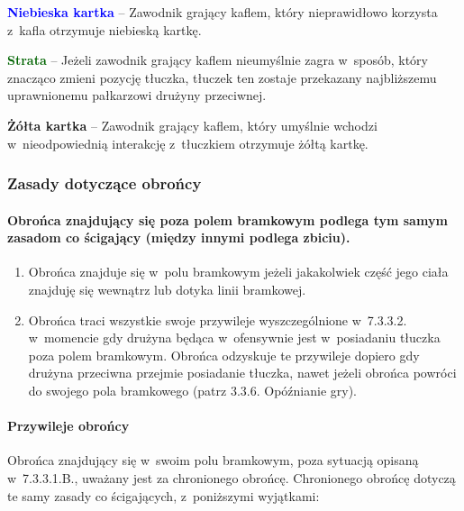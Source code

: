 \documentclass[12pt]{article}
\newcommand\yellowcard[1]{\bgroup\textcolor{darkyellow}{\textbf{#1}}}
\newcommand\bluecard[1]{\bgroup\textcolor{blue}{\textbf{#1}}}
\newcommand\other[1]{\bgroup\textcolor{darkgreen}{\textbf{#1}}}
\begin{document}
\bluecard{Niebieska kartka} -- Zawodnik grający kaflem, który nieprawidłowo
korzysta z~kafla otrzymuje niebieską kartkę.

\other{Strata} -- Jeżeli zawodnik grający kaflem nieumyślnie zagra w~sposób, który znacząco zmieni pozycję tłuczka, tłuczek ten zostaje
przekazany najbliższemu uprawnionemu pałkarzowi drużyny przeciwnej.

\yellowcard{Żółta kartka} -- Zawodnik grający kaflem, który umyślnie wchodzi w~nieodpowiednią interakcję z~tłuczkiem otrzymuje żółtą kartkę.

\subsubsection{Zasady dotyczące obrońcy}

\paragraph{Obrońca znajdujący się poza polem bramkowym podlega
	tym samym zasadom co ścigający (między innymi podlega zbiciu).}

\begin{enumerate}
	\item
	      Obrońca znajduje się w~polu bramkowym jeżeli jakakolwiek część jego
	      ciała znajduję się wewnątrz lub dotyka linii bramkowej.
	\item
	      Obrońca traci wszystkie swoje przywileje wyszczególnione w~7.3.3.2. w~momencie gdy drużyna będąca w~ofensywnie jest w~posiadaniu tłuczka
	      poza polem bramkowym. Obrońca odzyskuje te przywileje dopiero gdy
	      drużyna przeciwna przejmie posiadanie tłuczka, nawet jeżeli obrońca
	      powróci do swojego pola bramkowego (patrz 3.3.6. Opóźnianie gry).
\end{enumerate}

\paragraph{Przywileje obrońcy}
Obrońca znajdujący się w~swoim
polu bramkowym, poza sytuacją opisaną w~7.3.3.1.B., uważany jest za
chronionego obrońcę. Chronionego obrońcę dotyczą te samy zasady co
ścigających, z~poniższymi wyjątkami:
\end{document}
